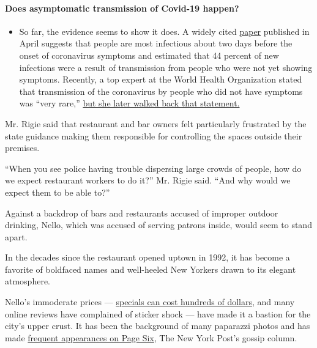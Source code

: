\begin{itemize}
{  \paragraph{Does asymptomatic transmission of Covid-19
  happen?}\label{does-asymptomatic-transmission-of-covid-19-happen}}

  \begin{itemize}
  \tightlist
  \item
    So far, the evidence seems to show it does. A widely cited
    \href{https://www.nature.com/articles/s41591-020-0869-5}{paper}
    published in April suggests that people are most infectious about
    two days before the onset of coronavirus symptoms and estimated that
    44 percent of new infections were a result of transmission from
    people who were not yet showing symptoms. Recently, a top expert at
    the World Health Organization stated that transmission of the
    coronavirus by people who did not have symptoms was ``very rare,''
    \href{https://www.nytimes3xbfgragh.onion/2020/06/09/world/coronavirus-updates.html?action=click\&pgtype=Article\&state=default\&region=MAIN_CONTENT_3\&context=storylines_faq\#link-1f302e21}{but
    she later walked back that statement.}
  \end{itemize}
\end{itemize}

Mr. Rigie said that restaurant and bar owners felt particularly
frustrated by the state guidance making them responsible for controlling
the spaces outside their premises.

``When you see police having trouble dispersing large crowds of people,
how do we expect restaurant workers to do it?'' Mr. Rigie said. ``And
why would we expect them to be able to?''

Against a backdrop of bars and restaurants accused of improper outdoor
drinking, Nello, which was accused of serving patrons inside, would seem
to stand apart.

In the decades since the restaurant opened uptown in 1992, it has become
a favorite of boldfaced names and well-heeled New Yorkers drawn to its
elegant atmosphere.

Nello's immoderate prices ---
\href{https://www.nytimes3xbfgragh.onion/2012/01/08/your-money/at-nello-a-case-of-restaurant-bill-shock-the-haggler.html}{specials
can cost hundreds of dollars}, and many online reviews have complained
of sticker shock --- have made it a bastion for the city's upper crust.
It has been the background of many paparazzi photos and has made
\href{https://www.nytimes3xbfgragh.onion/2007/05/27/fashion/27nello.html}{frequent
appearances on Page Six}, The New York Post's gossip column.

